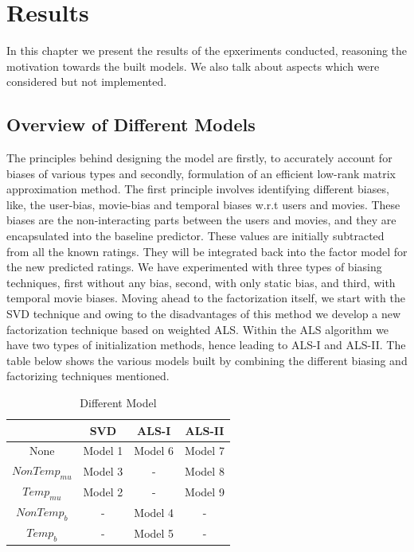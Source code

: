 \chapter{Results}


\textsf{In this chapter we present the results of the epxeriments conducted,
reasoning the motivation towards the built models. We also talk about aspects
which were considered but not implemented.}

\section{Overview of Different Models}
The principles behind designing the model are firstly, to accurately account for
biases of various types and secondly, formulation of an efficient low-rank
matrix approximation method. The first principle involves identifying different
biases, like, the user-bias, movie-bias and temporal biases w.r.t users and
movies. These biases are the non-interacting parts between the users and movies,
and they are encapsulated into the baseline predictor. These values are
initially subtracted from all the known ratings. They will be integrated back
into the factor model for the new predicted ratings. We have experimented with
three types of biasing techniques, first without any bias, second, with only
static bias, and third, with temporal movie biases. Moving ahead to the
factorization itself, we start with the SVD technique and owing to the
disadvantages of this method we develop a new factorization technique based on
weighted ALS. Within the ALS algorithm we have two types of initialization
methods, hence leading to ALS-I and ALS-II. The table below shows the various
models built by combining the different biasing and factorizing techniques
mentioned.


\begin{table}
\begin{center}
 
     \begin{tabular}{|c|c|c|c|}
       \hline
        & SVD & ALS-I & ALS-II \\ \hline
       None & Model 1 & Model 6 & Model 7\\        
       $NonTemp_{mu}$ & Model 3 & - & Model 8\\
       $Temp_{mu}$ & Model 2 & - & Model 9\\
       $NonTemp_b$ & - & Model 4 & -\\
       $Temp_b$ & - & Model 5 & -\\ \hline
    \end{tabular}
    \caption{Different Model}     
\end{center}
\end{table}

